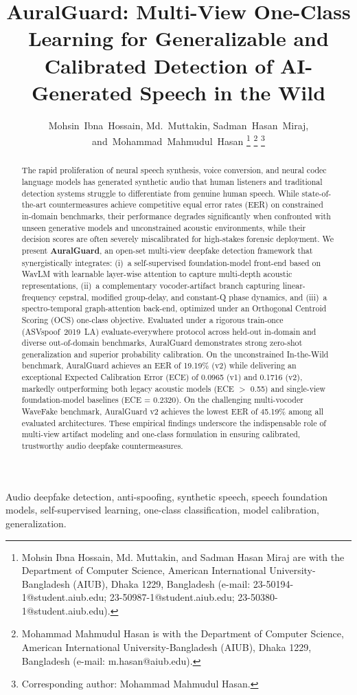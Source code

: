 \documentclass[journal]{IEEEtran}
\title{AuralGuard: Multi-View One-Class Learning for Generalizable and
Calibrated Detection of AI-Generated Speech in the Wild}
\author{Mohsin~Ibna~Hossain,
        Md.~Muttakin,
        Sadman~Hasan~Miraj,
        and~Mohammad~Mahmudul~Hasan%
\thanks{Mohsin Ibna Hossain, Md. Muttakin, and Sadman Hasan Miraj are with the Department of Computer Science, American International University-Bangladesh (AIUB), Dhaka 1229, Bangladesh (e-mail: 23-50194-1@student.aiub.edu; 23-50987-1@student.aiub.edu; 23-50380-1@student.aiub.edu).}%
\thanks{Mohammad Mahmudul Hasan is with the Department of Computer Science, American International University-Bangladesh (AIUB), Dhaka 1229, Bangladesh (e-mail: m.hasan@aiub.edu).}%
\thanks{Corresponding author: Mohammad Mahmudul Hasan.}}
\begin{document}
\maketitle

\begin{abstract}
The rapid proliferation of neural speech synthesis, voice conversion, and neural codec language models has generated synthetic audio that human listeners and traditional detection systems struggle to differentiate from genuine human speech. While state-of-the-art countermeasures achieve competitive equal error rates (EER) on constrained in-domain benchmarks, their performance degrades significantly when confronted with unseen generative models and unconstrained acoustic environments, while their decision scores are often severely miscalibrated for high-stakes forensic deployment. We present \textbf{AuralGuard}, an open-set multi-view deepfake detection framework that synergistically integrates: (i)~a self-supervised foundation-model front-end based on WavLM with learnable layer-wise attention to capture multi-depth acoustic representations, (ii)~a complementary vocoder-artifact branch capturing linear-frequency cepstral, modified group-delay, and constant-Q phase dynamics, and (iii)~a spectro-temporal graph-attention back-end, optimized under an Orthogonal Centroid Scoring (OCS) one-class objective. Evaluated under a rigorous train-once (ASVspoof~2019~LA) evaluate-everywhere protocol across held-out in-domain and diverse out-of-domain benchmarks, AuralGuard demonstrates strong zero-shot generalization and superior probability calibration. On the unconstrained In-the-Wild benchmark, AuralGuard achieves an EER of 19.19\% (v2) while delivering an exceptional Expected Calibration Error (ECE) of 0.0965 (v1) and 0.1716 (v2), markedly outperforming both legacy acoustic models (ECE $>$ 0.55) and single-view foundation-model baselines (ECE = 0.2320). On the challenging multi-vocoder WaveFake benchmark, AuralGuard v2 achieves the lowest EER of 45.19\% among all evaluated architectures. These empirical findings underscore the indispensable role of multi-view artifact modeling and one-class formulation in ensuring calibrated, trustworthy audio deepfake countermeasures.
\end{abstract}

\begin{IEEEkeywords}
Audio deepfake detection, anti-spoofing, synthetic speech, speech foundation models,
self-supervised learning, one-class classification, model calibration, generalization.
\end{IEEEkeywords}
\end{document}
